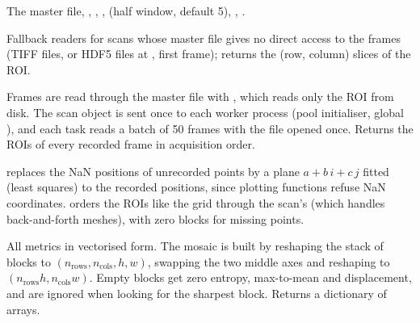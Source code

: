 
The master file, , , ,  (half
window, default 5), , .

Fallback readers for scans whose master file gives no direct access to the frames (TIFF
files, or HDF5 files at , first frame); 
returns the (row, column) slices of the ROI.

Frames are read through the master file with , which reads only the
ROI from disk. The scan object is sent once to each worker process (pool initialiser, global
), and each task reads a batch of 50 frames with the file opened once. Returns
the ROIs of every recorded frame in acquisition order.

 replaces the NaN positions of unrecorded points by a plane
$a + b\,i + c\,j$ fitted (least squares) to the recorded positions, since plotting functions
refuse NaN coordinates.  orders the ROIs like the grid through the scan's
 (which handles back-and-forth meshes), with zero blocks for missing points.

All metrics in vectorised form. The mosaic is built by reshaping the stack of blocks to
$(n_\mathrm{rows}, n_\mathrm{cols}, h, w)$, swapping the two middle axes and reshaping to
$(n_\mathrm{rows}h, n_\mathrm{cols}w)$. Empty blocks get zero entropy, max-to-mean and
displacement, and are ignored when looking for the sharpest block. Returns a dictionary of
arrays.

